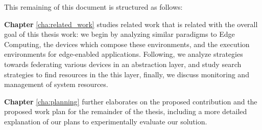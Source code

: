 This remaining of this document is structured as follows:

\textbf{Chapter} \ref{cha:related_work} studies related work that is related with the overall goal of this thesis work: we begin by analyzing similar paradigms to Edge Computing, the devices which compose these environments, and the execution environments for edge-enabled applications. Following, we analyze strategies towards federating various devices in an abstraction layer, and study search strategies to find resources in the this layer, finally, we discuss monitoring and management of system resources.

\textbf{Chapter} \ref{cha:planning} further elaborates on the proposed contribution and the proposed work plan for the remainder of the thesis, including a more detailed explanation of our plans to experimentally evaluate our solution.
